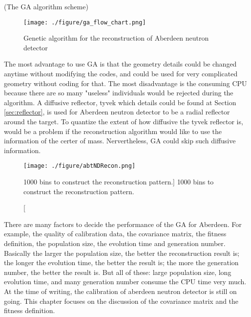 (The GA algorithm scheme)
\begin{figure}[h]
    \centering
    \texttt{[image: ./figure/ga\_flow\_chart.png]}
    \caption{Genetic algorithm for the reconstruction of Aberdeen neutron detector}
    \label{ga_flow_chart.png}
    \end{figure}


The most advantage to use GA is that the geometry details could be changed anytime without modifying the codes,
and could be used for very complicated geometry without coding for that. The most disadvantage is the consuming
CPU because there are so many "useless" individuals would be rejected during the algorithm.
A diffusive reflector, tyvek which details could be found at Section \ref{sec:reflector}, is used for Aberdeen neutron detector to
be a radial reflector around the target. To quantize the extent of how diffusive the tyvek reflector is, would be a problem
if the reconstruction algorithm would like to use the information of the certer of mass.
Nervertheless, GA could skip such diffusive information.


\begin{figure}[h]
    \centering
    \texttt{[image: ./figure/abtNDRecon.png]}
    \caption
    [1000 bins to construct the reconstruction pattern.]
    {1000 bins to construct the reconstruction pattern.}
    \label{fig:abtNDRecon.png}
    \end{figure}



There are many factors to decide the performance of the GA for Aberdeen.
For example, the quality of calibration data, the covariance matrix, the fitness definition,
the population size, the evolution time and generation number.
Basically the larger the population size, the better the reconstruction result is; the longer the evolution time, the better the result is;
the more the generation number, the better the result is. But all of these: large population size, long evolution time, and many generation
number consume the CPU time very much.
At the time of writing, the calibration of aberdeen neutron detector is still on going.
This chapter focuses on the discussion of the covariance matrix and the fitness definition.














